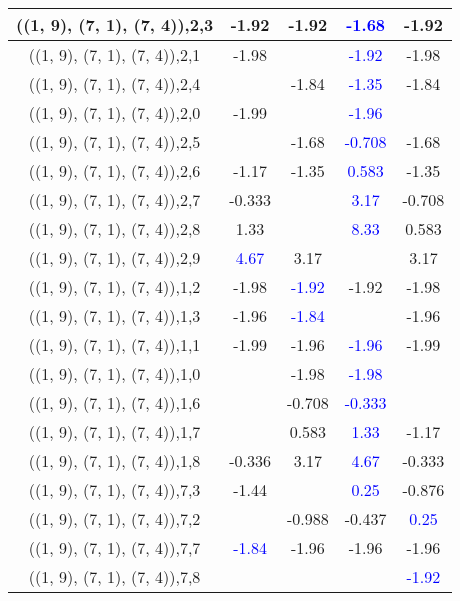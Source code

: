 \documentclass{article}
\begin{document}
\begin{center}
\begin{longtable}{|c|c|c|c|c|}
        	\hline
        	((1, 9), (7, 1), (7, 4)),2,3&-1.92&-1.92& \textcolor{blue}{-1.68}&-1.92\\
        	\hline
        	((1, 9), (7, 1), (7, 4)),2,1&-1.98&& \textcolor{blue}{-1.92}&-1.98\\
        	\hline
        	((1, 9), (7, 1), (7, 4)),2,4&&-1.84& \textcolor{blue}{-1.35}&-1.84\\
        	\hline
        	((1, 9), (7, 1), (7, 4)),2,0&-1.99&& \textcolor{blue}{-1.96}&\\
        	\hline
        	((1, 9), (7, 1), (7, 4)),2,5&&-1.68& \textcolor{blue}{-0.708}&-1.68\\
        	\hline
        	((1, 9), (7, 1), (7, 4)),2,6&-1.17&-1.35& \textcolor{blue}{0.583}&-1.35\\
        	\hline
        	((1, 9), (7, 1), (7, 4)),2,7&-0.333&& \textcolor{blue}{3.17}&-0.708\\
        	\hline
        	((1, 9), (7, 1), (7, 4)),2,8&1.33&& \textcolor{blue}{8.33}&0.583\\
        	\hline
        	((1, 9), (7, 1), (7, 4)),2,9& \textcolor{blue}{4.67}&3.17&&3.17\\
        	\hline
        	((1, 9), (7, 1), (7, 4)),1,2&-1.98& \textcolor{blue}{-1.92}&-1.92&-1.98\\
        	\hline
        	((1, 9), (7, 1), (7, 4)),1,3&-1.96& \textcolor{blue}{-1.84}&&-1.96\\
        	\hline
        	((1, 9), (7, 1), (7, 4)),1,1&-1.99&-1.96& \textcolor{blue}{-1.96}&-1.99\\
        	\hline
        	((1, 9), (7, 1), (7, 4)),1,0&&-1.98& \textcolor{blue}{-1.98}&\\
        	\hline
        	((1, 9), (7, 1), (7, 4)),1,6&&-0.708& \textcolor{blue}{-0.333}&\\
        	\hline
        	((1, 9), (7, 1), (7, 4)),1,7&&0.583& \textcolor{blue}{1.33}&-1.17\\
        	\hline
        	((1, 9), (7, 1), (7, 4)),1,8&-0.336&3.17& \textcolor{blue}{4.67}&-0.333\\
        	\hline
        	((1, 9), (7, 1), (7, 4)),7,3&-1.44&& \textcolor{blue}{0.25}&-0.876\\
        	\hline
        	((1, 9), (7, 1), (7, 4)),7,2&&-0.988&-0.437& \textcolor{blue}{0.25}\\
        	\hline
        	((1, 9), (7, 1), (7, 4)),7,7& \textcolor{blue}{-1.84}&-1.96&-1.96&-1.96\\
        	\hline
        	((1, 9), (7, 1), (7, 4)),7,8&&&& \textcolor{blue}{-1.92}\\

\end{longtable}
\end{center}
\end{document}
